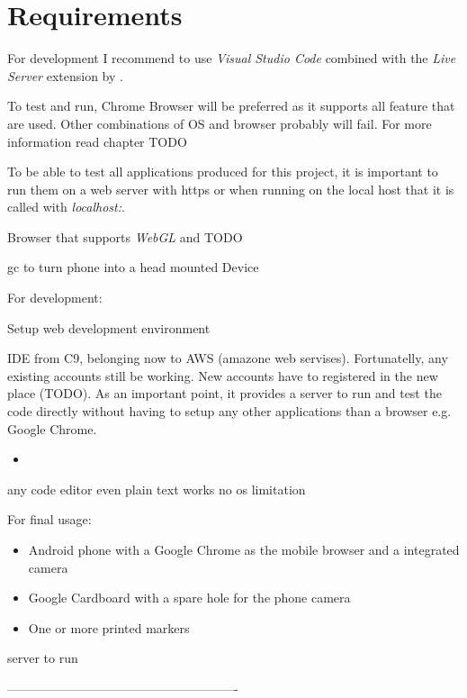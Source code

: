 \section{Requirements}

For development I recommend to use \textit{Visual Studio Code} combined with the \textit{Live Server} extension by \cite{Dey2019LiveServer}.

To test and run, Chrome Browser will be preferred as it supports all feature that are used. Other combinations of OS and browser probably will fail. For more information read chapter TODO



 To be able to test all applications produced for this project, it is important to run them on a web server with https or when running on the local host that it is called with \textit{localhost:}.



Browser that supports \textit{WebGL} and TODO

gc to turn phone into a head mounted Device  


For development:


Setup web development environment

IDE from C9, belonging now to AWS (amazone web servises). Fortunatelly, any existing accounts still be working. New accounts have to registered in the new place (TODO). As an important point, it provides a server to run and test the code directly without having to setup any other applications than a browser e.g. Google Chrome. 


\begin{itemize}
\item 
\end{itemize}
any  code editor even plain text works
no os limitation

For final usage:
\begin{itemize}
\item Android phone with a Google Chrome as the mobile browser and a integrated camera
\item Google Cardboard with a spare hole for the phone camera
\item One or more printed markers 
\end{itemize}

server to run








-------------------------------------------------------






